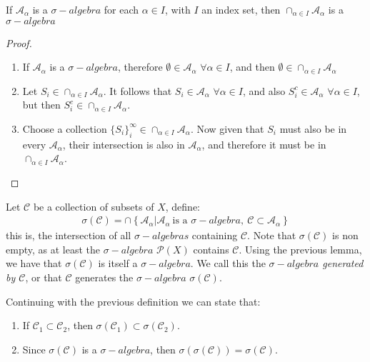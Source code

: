 \documentclass[aspectratio=169]{beamer}
\begin{document}
\begin{frame}
    \begin{lemma}
        If $\mathcal{A}_\alpha$ is a $\sigma-algebra$ for each $\alpha\in I$, with $I$ an index set, then $\cap_{\alpha\in I}\mathcal{A}_\alpha$ is a $\sigma-algebra$
    \end{lemma}
    
    \pause

    \begin{proof}
        \begin{enumerate}
            \item If $\mathcal{A}_\alpha$ is a $\sigma-algebra$, therefore $\emptyset\in\mathcal{A}_\alpha$ $\forall \alpha\in I$, and then $\emptyset \in \cap_{\alpha\in I}\mathcal{A}_\alpha$
            \item Let $S_i\in \cap_{\alpha\in I}\mathcal{A}_\alpha$. It follows that $S_i\in\mathcal{A}_\alpha$ $\forall \alpha\in I$, and also $S_i^c\in \mathcal{A}_\alpha$ $\forall \alpha\in I$, but then $S_i^c\in \cap_{\alpha\in I}\mathcal{A}_\alpha$.
            \item Choose a collection $\{S_i\}_i^\infty\in \cap_{\alpha\in I}\mathcal{A}_\alpha$. Now given that $S_i$ must also be in every $\mathcal{A}_\alpha$, their intersection is also in $\mathcal{A}_\alpha$, and therefore it must be in $\cap_{\alpha\in I}\mathcal{A}_\alpha$.
        \end{enumerate}
    \end{proof}
\end{frame}

\begin{frame}
    Let $\mathcal{C}$ be a collection of subsets of $X$, define: 
    \begin{align*}
        \sigma(\mathcal{C})=\cap\left\{\mathcal{A}_\alpha | \mathcal{A}_\alpha\ \text{is a }\sigma-algebra,\ \mathcal{C}\subset\mathcal{A}_\alpha\right\}
    \end{align*}
    this is, the intersection of all $\sigma-algebras$ containing $\mathcal{C}$. Note that $\sigma(\mathcal{C})$ is non empty, as at least the $\sigma-algebra$ $\mathcal{P}(X)$ contains $\mathcal{C}$. Using the previous lemma, we have that $\sigma(\mathcal{C})$ is itself a $\sigma-algebra$. We call this the \textit{$\sigma-algebra$ generated by $\mathcal{C}$}, or that $\mathcal{C}$ generates the $\sigma-algebra$ $\sigma(\mathcal{C})$.
\end{frame}

\begin{frame}
    \begin{fact}
        Continuing with the previous definition we can state that:
        \begin{enumerate}
            \item If $\mathcal{C}_1\subset \mathcal{C}_2$, then $\sigma(\mathcal{C}_1)\subset\sigma(\mathcal{C}_2)$.
            \item Since $\sigma(\mathcal{C})$ is a $\sigma-algebra$, then $\sigma\left(\sigma(\mathcal{C})\right)=\sigma(\mathcal{C})$.
        \end{enumerate}
    \end{fact}
\end{frame}
\end{document}
